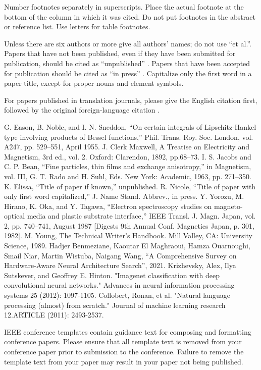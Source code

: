 \documentclass[conference]{IEEEtran}
\begin{document}
Number footnotes separately in superscripts. Place the actual footnote at 
the bottom of the column in which it was cited. Do not put footnotes in the 
abstract or reference list. Use letters for table footnotes.

Unless there are six authors or more give all authors' names; do not use 
``et al.''. Papers that have not been published, even if they have been 
submitted for publication, should be cited as ``unpublished'' \cite{b4}. Papers 
that have been accepted for publication should be cited as ``in press'' \cite{b5}. 
Capitalize only the first word in a paper title, except for proper nouns and 
element symbols.

For papers published in translation journals, please give the English 
citation first, followed by the original foreign-language citation \cite{b6}.

\begin{thebibliography}{00}
 G. Eason, B. Noble, and I. N. Sneddon, ``On certain integrals of Lipschitz-Hankel type involving products of Bessel functions,'' Phil. Trans. Roy. Soc. London, vol. A247, pp. 529--551, April 1955.
 J. Clerk Maxwell, A Treatise on Electricity and Magnetism, 3rd ed., vol. 2. Oxford: Clarendon, 1892, pp.68--73.
 I. S. Jacobs and C. P. Bean, ``Fine particles, thin films and exchange anisotropy,'' in Magnetism, vol. III, G. T. Rado and H. Suhl, Eds. New York: Academic, 1963, pp. 271--350.
 K. Elissa, ``Title of paper if known,'' unpublished.
 R. Nicole, ``Title of paper with only first word capitalized,'' J. Name Stand. Abbrev., in press.
 Y. Yorozu, M. Hirano, K. Oka, and Y. Tagawa, ``Electron spectroscopy studies on magneto-optical media and plastic substrate interface,'' IEEE Transl. J. Magn. Japan, vol. 2, pp. 740--741, August 1987 [Digests 9th Annual Conf. Magnetics Japan, p. 301, 1982].
 M. Young, The Technical Writer's Handbook. Mill Valley, CA: University Science, 1989.
 Hadjer Benmeziane, Kaoutar El Maghraoui, Hamza Ouarnoughi, Smail Niar, Martin Wistuba, Naigang Wang, ``A Comprehensive Survey on Hardware-Aware Neural Architecture Search'', 2021.
 Krizhevsky, Alex, Ilya Sutskever, and Geoffrey E. Hinton. "Imagenet classification with deep convolutional neural networks." Advances in neural information processing systems 25 (2012): 1097-1105.
 Collobert, Ronan, et al. "Natural language processing (almost) from scratch." Journal of machine learning research 12.ARTICLE (2011): 2493-2537.
\end{thebibliography}
\vspace{12pt}
\color{red}
IEEE conference templates contain guidance text for composing and formatting conference papers. Please ensure that all template text is removed from your conference paper prior to submission to the conference. Failure to remove the template text from your paper may result in your paper not being published.
\end{document}
